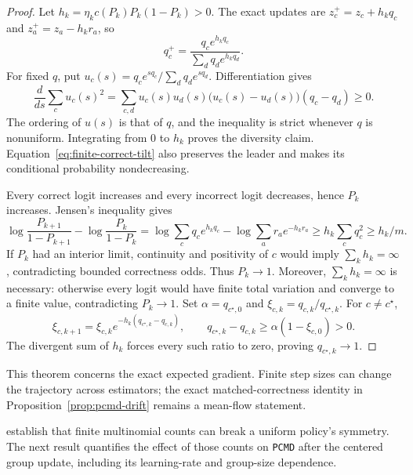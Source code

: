 \documentclass{article}
\newcommand{\enforcehalffinalproseline}{%
  \setlength{\parfillskip}{0pt plus .20\linewidth}}
\newcommand{\1}{\mathbf 1}
\newcommand{\pmd}{\texttt{PCMD}}
\theoremstyle{remark}
\theoremstyle{definition}
\theoremstyle{plain}
\begin{document}
\begin{proof}
\enforcehalffinalproseline
Let $h_k=\eta_kc(P_k)P_k(1-P_k)>0$. The exact updates are
$z_c^+=z_c+h_kq_c$ and $z_a^+=z_a-h_kr_a$, so
\begin{equation}
 q_c^+=\frac{q_c e^{h_kq_c}}{\sum_dq_d e^{h_kq_d}}.
 \label{eq:finite-correct-tilt}
\end{equation}
For fixed $q$, put $u_c(s)=q_ce^{sq_c}/\sum_dq_de^{sq_d}$.
Differentiation gives
\[
 \frac{d}{ds}\sum_cu_c(s)^2
 =\sum_{c,d}u_c(s)u_d(s)
       \big(u_c(s)-u_d(s)\big)(q_c-q_d)\ge0.
\]
The ordering of $u(s)$ is that of $q$, and the inequality is strict whenever
$q$ is nonuniform. Integrating from $0$ to $h_k$ proves the diversity claim.
Equation~\eqref{eq:finite-correct-tilt} also preserves the leader and makes
its conditional probability nondecreasing.

Every correct logit increases and every incorrect logit decreases, hence
$P_k$ increases. Jensen's inequality gives
\[
 \log\frac{P_{k+1}}{1-P_{k+1}}-\log\frac{P_k}{1-P_k}
 =\log\sum_cq_c e^{h_kq_c}-\log\sum_ar_a e^{-h_kr_a}
 \ge h_k\sum_cq_c^2\ge h_k/m.
\]
If $P_k$ had an interior limit, continuity and positivity of $c$ would imply
$\sum_kh_k=\infty$, contradicting bounded correctness odds. Thus $P_k\to1$.
Moreover, $\sum_kh_k=\infty$ is necessary: otherwise every logit would have
finite total variation and converge to a finite value, contradicting
$P_k\to1$.
Set $\alpha=q_{c^\star,0}$ and
$\xi_{c,k}=q_{c,k}/q_{c^\star,k}$. For $c\ne c^\star$,
\[
 \xi_{c,k+1}=\xi_{c,k}
  e^{-h_k(q_{c^\star,k}-q_{c,k})},
 \qquad
 q_{c^\star,k}-q_{c,k}
 \ge\alpha(1-\xi_{c,0})>0.
\]
The divergent sum of $h_k$ forces every such ratio to zero, proving
$q_{c^\star,k}\to1$.
\end{proof}

This theorem concerns the exact expected gradient. Finite step sizes can
change the trajectory across estimators; the exact matched-correctness
identity in Proposition~\ref{prop:pcmd-drift} remains a mean-flow statement.

\citet[Proposition~A.1]{lochab2026ucpo} establish that finite multinomial
counts can break a uniform policy's symmetry. The next result quantifies
the effect of those counts on \pmd{} after the centered group update,
including its learning-rate and group-size dependence.
\end{document}
